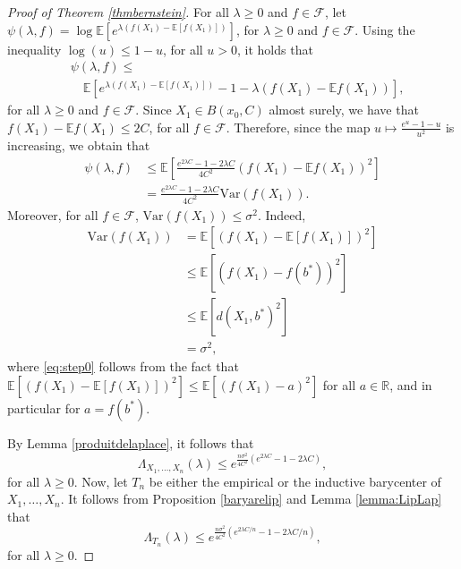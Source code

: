 \documentclass[10pt,a4paper]{article}
\theoremstyle{plain}
\theoremstyle{definition}
\theoremstyle{remark}
\newcommand{\R}{\mathbb{R}}
\newcommand{\E}{\mathbb{E}}
\newcommand{\var}{\mathrm{Var}}
\begin{document}
\begin{proof}[Proof of Theorem \ref{thmbernstein}]

For all $\lambda\geq 0$ and $f\in\mathcal F$, let $\psi(\lambda,f)=\log\E[e^{\lambda(f(X_1)-\E[f(X_1)])}]$, for $\lambda\geq 0$ and $f\in\mathcal F$. Using the inequality $\log(u)\leq 1-u$, for all $u>0$, it holds that 
\begin{align*}
    & \psi(\lambda,f) \leq \\
    & \quad \E \left[e^{\lambda(f(X_1)-\E[f(X_1)])} -1 -\lambda(f(X_1)-\E f(X_1))\right],
\end{align*}
for all $\lambda\geq 0$ and $f\in\mathcal F$. Since $X_1\in B(x_0,C)$ almost surely, we have that $f(X_1)-\E f(X_1)\leq 2C$, for all $f\in\mathcal F$. Therefore, since the map $u\mapsto \frac{e^u -1 -u}{u^2}$ is increasing, we obtain that
\begin{align*}
    \psi(\lambda,f) & \leq \E \left[ \frac{e^{2\lambda C} -1 -2\lambda C}{4C^2}(f(X_1)-\E f(X_1))^2\right] \\
    & = \frac{e^{2\lambda C} -1 -2\lambda C}{4C^2}\var(f(X_1)).
\end{align*}
Moreover, for all $f\in\mathcal F$, $\var(f(X_1))\leq \sigma^2$. Indeed, 
\begin{align}
    \var(f(X_1)) & = \E\left[(f(X_1)-\E[f(X_1)])^2\right] \nonumber \\
    & \leq \E\left[(f(X_1)-f(b^*))^2\right] \label{eq:step0} \\
    & \leq \E\left[d(X_1,b^*)^2\right] \nonumber \\
    & = \sigma^2, \nonumber
\end{align}
where \eqref{eq:step0} follows from the fact that $\E\left[(f(X_1)-\E[f(X_1)])^2\right]\leq \E\left[(f(X_1)-a)^2\right]$ for all $a\in\R$, and in particular for $a=f(b^*)$.

By Lemma \ref{produitdelaplace}, it follows that 
$$\Lambda_{X_1,\ldots,X_n}(\lambda)\leq e^{\frac{n\sigma^2}{4C^2}(e^{2\lambda C} -1 -2\lambda C)},$$
for all $\lambda\geq 0$.
Now, let $T_n$ be either the empirical or the inductive barycenter of $X_1,\ldots,X_n$. It follows from Proposition \ref{baryarelip} and Lemma \ref{lemma:LipLap} that
$$\Lambda_{T_n}(\lambda)\leq e^{\frac{n\sigma^2}{4C^2}(e^{2\lambda C/n} -1 -2\lambda C/n)},$$
for all $\lambda\geq 0$.


\end{proof}
\end{document}
